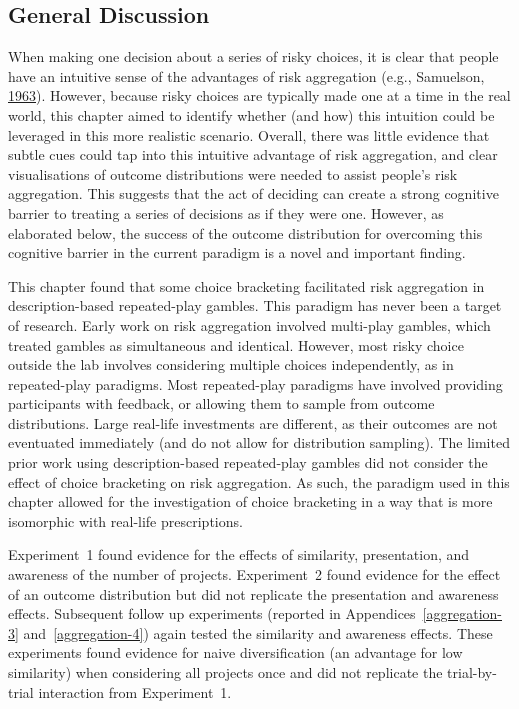 \documentclass[
  english,
  man, donotrepeattitle,floatsintext]{apa7}
\theoremstyle{definition}
\theoremstyle{definition}
\theoremstyle{definition}
\theoremstyle{definition}
\theoremstyle{remark}
\begin{document}
\hypertarget{general-discussion}{%
\subsection{General Discussion}\label{general-discussion}}

When making one decision about a series of risky choices, it is clear that
people have an intuitive sense of the advantages of risk aggregation (e.g., Samuelson, \protect\hyperlink{ref-samuelson1963}{1963}). However, because risky choices are typically made one at a time
in the real world, this chapter aimed to identify whether (and how) this
intuition could be leveraged in this more realistic scenario. Overall, there was
little evidence that subtle cues could tap into this intuitive advantage of risk
aggregation, and clear visualisations of outcome distributions were needed to
assist people's risk aggregation. This suggests that the act of deciding can
create a strong cognitive barrier to treating a series of decisions as if they
were one. However, as elaborated below, the success of the outcome distribution
for overcoming this cognitive barrier in the current paradigm is a novel and
important finding.

This chapter found that some choice bracketing facilitated risk aggregation in
description-based repeated-play gambles. This paradigm has never been a target
of research. Early work on risk aggregation involved multi-play gambles, which
treated gambles as simultaneous and identical. However, most risky choice
outside the lab involves considering multiple choices independently, as in
repeated-play paradigms. Most repeated-play paradigms have involved providing
participants with feedback, or allowing them to sample from outcome
distributions. Large real-life investments are different, as their outcomes are
not eventuated immediately (and do not allow for distribution sampling). The
limited prior work using description-based repeated-play gambles did not
consider the effect of choice bracketing on risk aggregation. As such, the
paradigm used in this chapter allowed for the investigation of choice bracketing
in a way that is more isomorphic with real-life prescriptions.

Experiment~1 found evidence for the effects of similarity, presentation, and
awareness of the number of projects. Experiment~2 found evidence for the effect
of an outcome distribution but did not replicate the presentation and awareness
effects. Subsequent follow up experiments (reported in
Appendices~\ref{aggregation-3} and~\ref{aggregation-4}) again tested the
similarity and awareness effects. These experiments found evidence for naive
diversification (an advantage for low similarity) when considering all projects
once and did not replicate the trial-by-trial interaction from Experiment~1.
\end{document}
